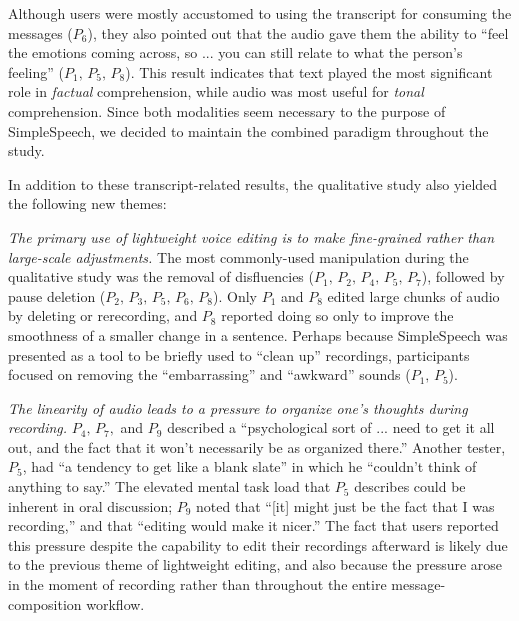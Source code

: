 Although users were mostly accustomed to using the transcript for consuming the messages ($P_6$), they also pointed out that the audio gave them the ability to ``feel the emotions coming across, so ... you can still relate to what the person’s feeling'' ($P_1,\,P_5,\,P_8$).
This result indicates that text played the most significant role in \emph{factual} comprehension, while audio was most useful for \emph{tonal} comprehension.
Since both modalities seem necessary to the purpose of SimpleSpeech, we decided to maintain the combined paradigm throughout the study.

In addition to these transcript-related results, the qualitative study also yielded the following new themes:

\emph{The primary use of lightweight voice editing is to make fine-grained rather than large-scale adjustments.}
The most commonly-used manipulation during the qualitative study was the removal of disfluencies ($P_1,\,P_2,\,P_4,\,P_5,\,P_7$), followed by pause deletion ($P_2,\,P_3,\,P_5,\,P_6,\,P_8$). 
Only $P_1$ and $P_8$ edited large chunks of audio by deleting or rerecording, and $P_8$ reported doing so only to improve the smoothness of a smaller change in a sentence.
Perhaps because SimpleSpeech was presented as a tool to be briefly used to ``clean up'' recordings, participants focused on removing the ``embarrassing'' and ``awkward'' sounds ($P_1,\,P_5$). 

\emph{The linearity of audio leads to a pressure to organize one's thoughts during recording.}
$P_4,\,P_7,$ and $P_9$ described a ``psychological sort of ... need to get it all out, and the fact that it won't necessarily be as organized there.'' 
Another tester, $P_5$, had ``a tendency to get like a blank slate'' in which he ``couldn't think of anything to say.'' 
The elevated mental task load that $P_5$ describes could be inherent in oral discussion; $P_9$ noted that ``[it] might just be the fact that I was recording,'' and that ``editing would make it nicer.'' 
The fact that users reported this pressure despite the capability to edit their recordings afterward is likely due to the previous theme of lightweight editing, and also because the pressure arose in the moment of recording rather than throughout the entire message-composition workflow.

